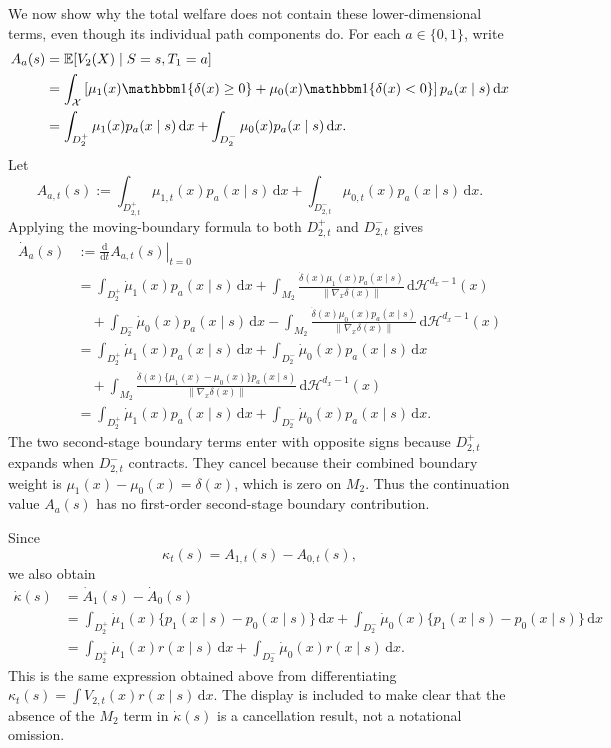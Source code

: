 \documentclass[12pt]{article}
\newcommand{\1}{\mathbf{1}}
\begin{document}
We now show why the total welfare does not contain these lower-dimensional
terms, even though its individual path components do. For each
$a\in\{0,1\}$, write
\begin{align*}
A_a(s)
&=
\mathbb E[V_2(X)\mid S=s,T_1=a] \\
&=
\int_{\mathcal X}
\left[
\mu_1(x)\mathbbm 1\{\delta(x)\geq 0\}
+
\mu_0(x)\mathbbm 1\{\delta(x)<0\}
\right]
p_a(x\mid s)\,\mathrm dx \\
&=
\int_{D_2^+}\mu_1(x)p_a(x\mid s)\,\mathrm dx
+
\int_{D_2^-}\mu_0(x)p_a(x\mid s)\,\mathrm dx.
\end{align*}
Let
\[
A_{a,t}(s)
:=
\int_{D_{2,t}^+}\mu_{1,t}(x)p_a(x\mid s)\,\mathrm dx
+
\int_{D_{2,t}^-}\mu_{0,t}(x)p_a(x\mid s)\,\mathrm dx.
\]
Applying the moving-boundary formula to both $D_{2,t}^+$ and $D_{2,t}^-$ gives
\begin{align*}
\dot A_a(s)
&:=
\left.\frac{\mathrm d}{\mathrm dt}A_{a,t}(s)\right|_{t=0} \\
&=
\int_{D_2^+}\dot\mu_1(x)p_a(x\mid s)\,\mathrm dx
+
\int_{M_2}
\frac{\dot\delta(x)\mu_1(x)p_a(x\mid s)}
{\lVert\nabla_x\delta(x)\rVert}
\,\mathrm d\mathcal H^{d_x-1}(x) \\
&\quad+
\int_{D_2^-}\dot\mu_0(x)p_a(x\mid s)\,\mathrm dx
-
\int_{M_2}
\frac{\dot\delta(x)\mu_0(x)p_a(x\mid s)}
{\lVert\nabla_x\delta(x)\rVert}
\,\mathrm d\mathcal H^{d_x-1}(x) \\
&=
\int_{D_2^+}\dot\mu_1(x)p_a(x\mid s)\,\mathrm dx
+
\int_{D_2^-}\dot\mu_0(x)p_a(x\mid s)\,\mathrm dx \\
&\quad+
\int_{M_2}
\frac{\dot\delta(x)\{\mu_1(x)-\mu_0(x)\}p_a(x\mid s)}
{\lVert\nabla_x\delta(x)\rVert}
\,\mathrm d\mathcal H^{d_x-1}(x) \\
&=
\int_{D_2^+}\dot\mu_1(x)p_a(x\mid s)\,\mathrm dx
+
\int_{D_2^-}\dot\mu_0(x)p_a(x\mid s)\,\mathrm dx.
\end{align*}
The two second-stage boundary terms enter with opposite signs because
$D_{2,t}^+$ expands when $D_{2,t}^-$ contracts. They cancel because their
combined boundary weight is $\mu_1(x)-\mu_0(x)=\delta(x)$, which is zero on
$M_2$. Thus the continuation value $A_a(s)$ has no first-order second-stage
boundary contribution.

Since
\[
\kappa_t(s)=A_{1,t}(s)-A_{0,t}(s),
\]
we also obtain
\begin{align*}
\dot\kappa(s)
&=
\dot A_1(s)-\dot A_0(s) \\
&=
\int_{D_2^+}\dot\mu_1(x)\{p_1(x\mid s)-p_0(x\mid s)\}\,\mathrm dx
+
\int_{D_2^-}\dot\mu_0(x)\{p_1(x\mid s)-p_0(x\mid s)\}\,\mathrm dx \\
&=
\int_{D_2^+}\dot\mu_1(x)r(x\mid s)\,\mathrm dx
+
\int_{D_2^-}\dot\mu_0(x)r(x\mid s)\,\mathrm dx.
\end{align*}
This is the same expression obtained above from differentiating
$\kappa_t(s)=\int V_{2,t}(x)r(x\mid s)\,\mathrm dx$. The display is included
to make clear that the absence of the $M_2$ term in $\dot\kappa(s)$ is a
cancellation result, not a notational omission.
\end{document}
